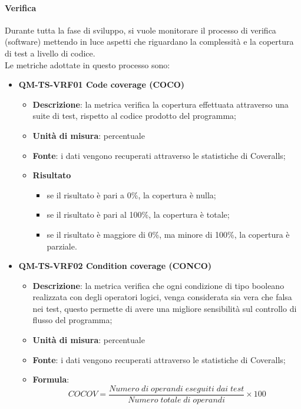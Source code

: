 			\paragraph{Verifica}
				Durante tutta la fase di sviluppo, si vuole monitorare il processo di verifica (software) mettendo in luce aspetti che riguardano la complessità e la copertura di test a livello di codice. \\
				Le metriche  adottate in questo processo sono:
				\begin{itemize}
					\item\textbf{QM-TS-VRF01 Code coverage (COCO)}
						\begin{itemize}
							\item\textbf{Descrizione}: la metrica verifica la copertura effettuata attraverso una suite di test, rispetto al codice prodotto del programma;
							\item\textbf{Unità di misura}: percentuale
							\item\textbf{Fonte}: i dati vengono recuperati attraverso le statistiche di Coveralls;
							\item\textbf{Risultato}
								\begin{itemize}
									\item se il risultato è pari a 0\%, la copertura è nulla;
									\item se il risultato è pari al 100\%, la copertura è totale;
									\item se il risultato è maggiore di 0\%, ma minore di 100\%, la copertura è parziale.
								\end{itemize}
						\end{itemize}
					\item\textbf{QM-TS-VRF02 Condition coverage (CONCO)}
						\begin{itemize}
							\item\textbf{Descrizione}: la metrica verifica che ogni condizione di tipo booleano realizzata con degli operatori logici, venga considerata sia vera che falsa nei test, questo permette di avere una migliore sensibilità sul controllo di flusso del programma;
							\item\textbf{Unità di misura}: percentuale
							\item\textbf{Fonte}: i dati vengono recuperati attraverso le statistiche di Coveralls;
							\item\textbf{Formula}: 
								\[ COCOV = \frac{\mathit{Numero\;di\;operandi\;eseguiti\;dai\;test}}{\mathit{Numero\;totale\;di\;operandi}} \times 100 \]

\end{itemize}
\end{itemize}
